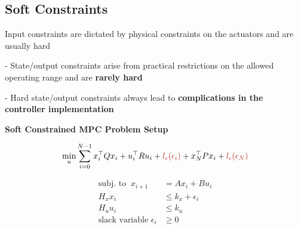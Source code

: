 

% 
\subsection{Soft Constraints}

Input constraints are dictated by physical constraints on
the actuators and are usually hard

- State/output constraints arise from practical restrictions
on the allowed operating range and are \textbf{rarely hard}

- Hard state/output constraints always lead to
\textbf{complications in the controller implementation}

\begin{sstTitleBox}[ForestGreen]{\center\textbf{\large
			Soft Constrained MPC Problem Setup
		}
	}


	\begin{adjustbox}{rndcorners=0.5mm}
		\begin{sstOnlyFrame}[ForestGreen]
			\[
				\min_u\sum_{i=0}^{N-1}
				x_i^\top Q x_i + u_i^\top R u_i
				+\color{BrickRed}l_\epsilon(\epsilon_i)\color{black}
				+x_N^\top P x_i
				+\color{BrickRed}l_\epsilon(\epsilon_N)
			\]
		\end{sstOnlyFrame}
	\end{adjustbox}
	\[\begin{aligned}
			\text{subj.\ to }\   x_{i+1}      & = Ax_i + Bu_i      \\
			H_xx_i                            & \le k_x+\epsilon_i \\
			H_uu_i                            & \le k_u            \\
			\text{slack variable }	\epsilon_i & \ge0
		\end{aligned}\]

\end{sstTitleBox}

